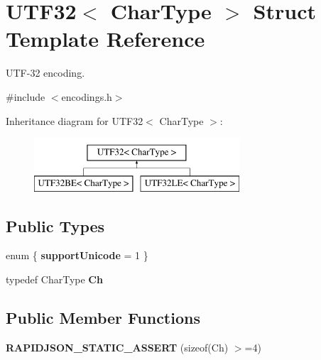 \hypertarget{structUTF32}{}\section{U\+T\+F32$<$ Char\+Type $>$ Struct Template Reference}
\label{structUTF32}


U\+T\+F-\/32 encoding.  




{\ttfamily \#include $<$encodings.\+h$>$}

Inheritance diagram for U\+T\+F32$<$ Char\+Type $>$\+:\begin{figure}[H]
\begin{center}
\leavevmode
\includegraphics[height=2.000000cm]{structUTF32}
\end{center}
\end{figure}
\subsection*{Public Types}
\begin{DoxyCompactItemize}
\item 
enum \{ {\bfseries support\+Unicode} = 1
 \}\hypertarget{structUTF32_abe791c52b9d1305aacf92ddc15c11ab4}{}\label{structUTF32_abe791c52b9d1305aacf92ddc15c11ab4}

\item 
typedef Char\+Type {\bfseries Ch}\hypertarget{structUTF32_ab4502672d56436e730ca5f647bb52be9}{}\label{structUTF32_ab4502672d56436e730ca5f647bb52be9}

\end{DoxyCompactItemize}
\subsection*{Public Member Functions}
\begin{DoxyCompactItemize}
\item 
{\bfseries R\+A\+P\+I\+D\+J\+S\+O\+N\+\_\+\+S\+T\+A\+T\+I\+C\+\_\+\+A\+S\+S\+E\+RT} (sizeof(Ch) $>$=4)\hypertarget{structUTF32_aae11b766f799d311679d59e9f7077f83}{}\label{structUTF32_aae11b766f799d311679d59e9f7077f83}

\end{DoxyCompactItemize}
